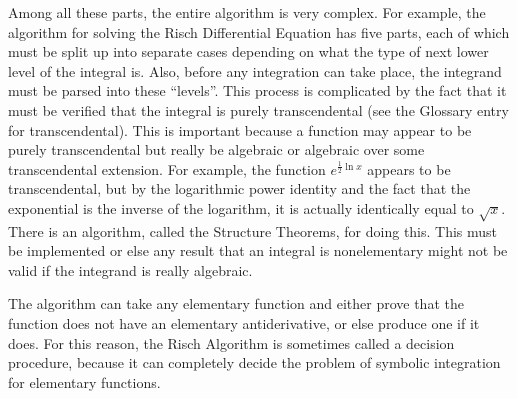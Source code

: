 Among all these parts, the entire algorithm is very complex.  For
example, the algorithm for solving the Risch Differential Equation has
five parts, each of which must be split up into separate cases depending
on what the type of next lower level of the integral is. Also, before
any \gls{integration} can take place, the \gls{integrand} must be parsed
into these ``levels''.  This process is complicated by the fact that it
must be verified that the integral is purely \gls{transcendental} (see
the Glossary entry for \gls{transcendental}).  This is important because
a function may appear to be purely \gls{transcendental} but really be
\gls{algebraic} or \gls{algebraic} over some \gls{transcendental}
extension.  For example, the function $e^{\frac{1}{2}\ln{x}}$ appears to
be \gls{transcendental}, but by the logarithmic power identity and the fact
that the exponential is the inverse of the logarithm, it is actually
identically equal to $\sqrt{x}$.  There is an algorithm, called the
Structure Theorems, for doing this.  This must be implemented or else
any result that an integral is nonelementary might not be valid if the
\gls{integrand} is really \gls{algebraic}.  

The algorithm can take any \gls{elementary} function and either prove that the
function does not have an \gls{elementary} antiderivative, or else
produce one if it does.  For this reason, the Risch Algorithm is
sometimes called a decision procedure, because it can completely decide
the problem of symbolic \gls{integration} for \gls{elementary} functions.  
